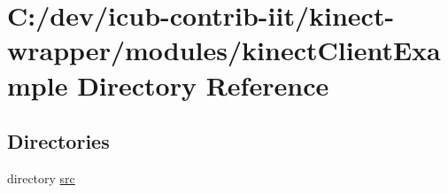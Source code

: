 \section{C\+:/dev/icub-\/contrib-\/iit/kinect-\/wrapper/modules/kinect\+Client\+Example Directory Reference}
\label{dir_315e5efb410a16c3dc704eab1dfa1351}
\subsection*{Directories}
\begin{DoxyCompactItemize}
\item 
directory \hyperlink{dir_451f07972b1bbda26c737cb09edda0a4}{src}
\end{DoxyCompactItemize}
